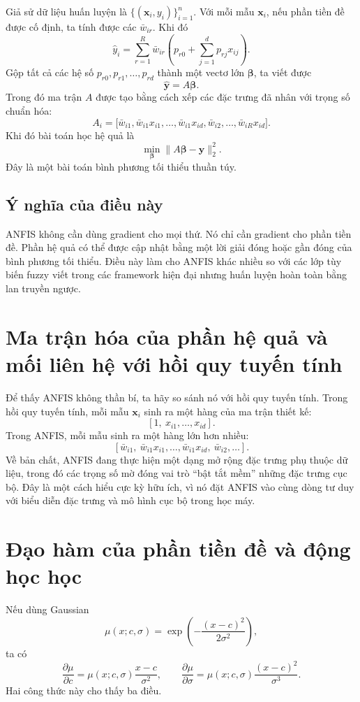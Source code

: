 Giả sử dữ liệu huấn luyện là \(\{(\bm{x}_i,y_i)\}_{i=1}^n\). Với mỗi mẫu \(\bm{x}_i\), nếu phần tiền đề được cố định, ta tính được các \(\bar{w}_{ir}\). Khi đó
\[
\hat{y}_i
=
\sum_{r=1}^R
\bar{w}_{ir}
\left(
p_{r0}+\sum_{j=1}^d p_{rj}x_{ij}
\right).
\]
Gộp tất cả các hệ số \(p_{r0},p_{r1},\dots,p_{rd}\) thành một vectơ lớn \(\bm{\beta}\), ta viết được
\[
\hat{\bm{y}}=A\bm{\beta}.
\]
Trong đó ma trận \(A\) được tạo bằng cách xếp các đặc trưng đã nhân với trọng số chuẩn hóa:
\[
A_i=
\big[
\bar{w}_{i1},
\bar{w}_{i1}x_{i1},
\dots,
\bar{w}_{i1}x_{id},
\bar{w}_{i2},
\dots,
\bar{w}_{iR}x_{id}
\big].
\]
Khi đó bài toán học hệ quả là
\[
\min_{\bm{\beta}}\|A\bm{\beta}-\bm{y}\|_2^2.
\]
Đây là một bài toán bình phương tối thiểu thuần túy.

\subsection{Ý nghĩa của điều này}

ANFIS không cần dùng gradient cho mọi thứ. Nó chỉ cần gradient cho phần tiền đề. Phần hệ quả có thể được cập nhật bằng một lời giải đóng hoặc gần đóng của bình phương tối thiểu. Điều này làm cho ANFIS khác nhiều so với các lớp tùy biến fuzzy viết trong các framework hiện đại nhưng huấn luyện hoàn toàn bằng lan truyền ngược.

\section{Ma trận hóa của phần hệ quả và mối liên hệ với hồi quy tuyến tính}

Để thấy ANFIS không thần bí, ta hãy so sánh nó với hồi quy tuyến tính. Trong hồi quy tuyến tính, mỗi mẫu \(\bm{x}_i\) sinh ra một hàng của ma trận thiết kế:
\[
[1,\ x_{i1},\dots,x_{id}].
\]
Trong ANFIS, mỗi mẫu sinh ra một hàng lớn hơn nhiều:
\[
[\bar{w}_{i1},\ \bar{w}_{i1}x_{i1},\dots,\bar{w}_{i1}x_{id},\ \bar{w}_{i2},\dots].
\]
Về bản chất, ANFIS đang thực hiện một dạng mở rộng đặc trưng phụ thuộc dữ liệu, trong đó các trọng số mờ đóng vai trò ``bật tắt mềm'' những đặc trưng cục bộ. Đây là một cách hiểu cực kỳ hữu ích, vì nó đặt ANFIS vào cùng dòng tư duy với biểu diễn đặc trưng và mô hình cục bộ trong học máy.

\section{Đạo hàm của phần tiền đề và động học học}

Nếu dùng Gaussian
\[
\mu(x;c,\sigma)=\exp\left(-\frac{(x-c)^2}{2\sigma^2}\right),
\]
ta có
\[
\frac{\partial \mu}{\partial c}
=
\mu(x;c,\sigma)\frac{x-c}{\sigma^2},
\qquad
\frac{\partial \mu}{\partial \sigma}
=
\mu(x;c,\sigma)\frac{(x-c)^2}{\sigma^3}.
\]
Hai công thức này cho thấy ba điều.

